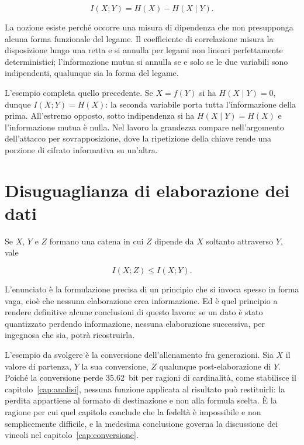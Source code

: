 \begin{equation}
I(X;Y) = H(X) - H(X \mid Y).
\end{equation}

La nozione esiste perché occorre una misura di dipendenza che non presupponga alcuna forma funzionale del legame. Il coefficiente di correlazione misura la disposizione lungo una retta e si annulla per legami non lineari perfettamente deterministici; l'informazione mutua si annulla se e solo se le due variabili sono indipendenti, qualunque sia la forma del legame.

L'esempio completa quello precedente. Se $X = f(Y)$ si ha $H(X\mid Y) = 0$, dunque $I(X;Y) = H(X)$: la seconda variabile porta tutta l'informazione della prima. All'estremo opposto, sotto indipendenza si ha $H(X \mid Y) = H(X)$ e l'informazione mutua è nulla. Nel lavoro la grandezza compare nell'argomento dell'attacco per sovrapposizione, dove la ripetizione della chiave rende una porzione di cifrato informativa su un'altra.

\section{Disuguaglianza di elaborazione dei dati}

Se $X$, $Y$ e $Z$ formano una catena in cui $Z$ dipende da $X$ soltanto attraverso $Y$, vale

\begin{equation}
I(X;Z) \le I(X;Y).
\end{equation}

L'enunciato è la formulazione precisa di un principio che si invoca spesso in forma vaga, cioè che nessuna elaborazione crea informazione. Ed è quel principio a rendere definitive alcune conclusioni di questo lavoro: se un dato è stato quantizzato perdendo informazione, nessuna elaborazione successiva, per ingegnosa che sia, potrà ricostruirla.

L'esempio da svolgere è la conversione dell'allenamento fra generazioni. Sia $X$ il valore di partenza, $Y$ la sua conversione, $Z$ qualunque post-elaborazione di $Y$. Poiché la conversione perde \SI{35,62}{bit} per ragioni di cardinalità, come stabilisce il capitolo~\ref{cap:analisi}, nessuna funzione applicata al risultato può restituirli: la perdita appartiene al formato di destinazione e non alla formula scelta. È la ragione per cui quel capitolo conclude che la fedeltà è impossibile e non semplicemente difficile, e la medesima conclusione governa la discussione dei vincoli nel capitolo~\ref{cap:conversione}.
